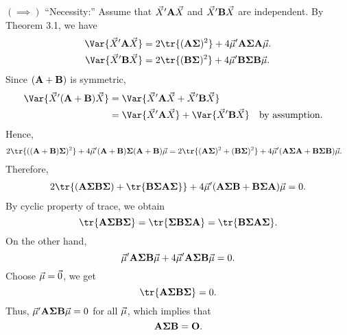 \begin{Theorem}{}{}
    $ (\implies) $ ``Necessity:'' Assume that
    $ \vec{X}'\mathbf{A}\vec{X} $ and
    $ \vec{X}'\mathbf{B}\vec{X} $ are independent.
    By Theorem 3.1, we have
    \begin{align*}
        \Var{\Vector{X}'\Matrix{A}\Vector{X}}
         & =2\tr{(\Matrix{A\Sigma})^2}+4 \Vector{\mu}'\Matrix{A\Sigma A}\Vector{\mu}. \\
        \Var{\Vector{X}'\Matrix{B}\Vector{X}}
         & =2\tr{(\Matrix{B\Sigma})^2}+4 \Vector{\mu}'\Matrix{B\Sigma B}\Vector{\mu}.
    \end{align*}
    Since $ (\mathbf{A}+\mathbf{B}) $ is symmetric,
    \begin{align*}
        \Var{\Vector{X}'(\Matrix{A}+\Matrix{B})\Vector{X}}
         & =\Var{\Vector{X}'\Matrix{A}\Vector{X}+\Vector{X}'\Matrix{B}\Vector{X}}                                  \\
         & =\Var{\Vector{X}'\Matrix{A}\Vector{X}}+\Var{\Vector{X}'\Matrix{B}\Vector{X}} &  & \text{by assumption}.
    \end{align*}
    Hence,
    \begin{align*}
        2\tr{((\Matrix{A}+\Matrix{B})\Matrix{\Sigma})^2}+4 \Vector{\mu}'(\Matrix{A}+\Matrix{B})\Matrix{\Sigma}(\Matrix{A}+\Matrix{B})\Vector{\mu}
         & =2\tr{(\Matrix{A\Sigma})^2+(\Matrix{B\Sigma})^2}+4 \Vector{\mu}'(\Matrix{A\Sigma A}+\Matrix{B\Sigma B})\Vector{\mu}.
    \end{align*}
    Therefore,
    \begin{align*}
        2\tr{(\Matrix{A\Sigma B\Sigma})+\tr{\Matrix{B\Sigma A\Sigma}}}
        +4 \Vector{\mu}'(\Matrix{A\Sigma B}+\Matrix{B\Sigma A})\Vector{\mu}=0.
    \end{align*}
    By cyclic property of trace, we obtain
    \[ \tr{\Matrix{A\Sigma B\Sigma}}=\tr{\Matrix{\Sigma B\Sigma A}}=\tr{\Matrix{B\Sigma A\Sigma}}. \]
    On the other hand,
    \[ \vec{\mu}'\mathbf{A\Sigma B}\vec{\mu}+4 \vec{\mu}'\mathbf{A\Sigma B}\vec{\mu}=0. \]
    Choose $ \vec{\mu}=\vec{0} $, we get
    \[ \tr{\Matrix{A\Sigma B\Sigma}}=0. \]
    Thus, $ \vec{\mu}'\mathbf{A\Sigma B}\vec{\mu}=0 $ for all $ \vec{\mu} $, which implies
    that
    \[ \mathbf{A\Sigma B}=\mathbf{O}. \]
\end{Theorem}
